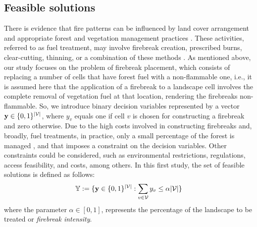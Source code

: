 \documentclass[a4paper,fleqn]{cas-sc}
\begin{document}
\subsection{Feasible solutions}
There is evidence that fire patterns can be influenced by land cover arrangement and appropriate forest and vegetation management practices \citep{amiro2001fire,cheney1993influence}. These activities, referred to as fuel treatment, may involve firebreak creation, prescribed burns, clear-cutting, thinning, or a combination of these methods \citep{North2015ReformFF}. As mentioned above, our study focuses on the problem of firebreak placement, which consists of replacing a number of cells that have forest fuel with a non-flammable one, i.e., it is assumed here that the application of a firebreak to a landscape cell involves the complete removal of vegetation fuel at that location, rendering the firebreaks non-flammable. So, we introduce binary decision variables represented by a vector $ \vb{y} \in \{0,1\}^{\vert\mathcal{V}\vert} $, where $y_v$ equals one if cell $v$ is chosen for constructing a firebreak and zero otherwise. Due to the high costs involved in constructing firebreaks and, broadly, fuel treatments, in practice, only a small percentage of the forest is managed \citep{oliveira2016assessing,jingan2005land}, and that imposes a constraint on the decision variables. Other constraints could be considered, such as environmental restrictions, regulations, access feasibility, and costs, among others. In this first study, the set of feasible solutions is defined  as follows:
\begin{equation} 
    \mathbb{Y} := \{ \vb{y} \in \{0,1\}^{\lvert \mathcal{V}\vert}: \sum_{v\in\mathcal{V}}y_{v}\leq\alpha\lvert \mathcal{V}\vert  \}
    \label{Eq:Constraint}
\end{equation}
where the parameter $\alpha \in [0, 1]$, represents the percentage of the landscape to be treated or \textit{firebreak intensity}.
\end{document}
